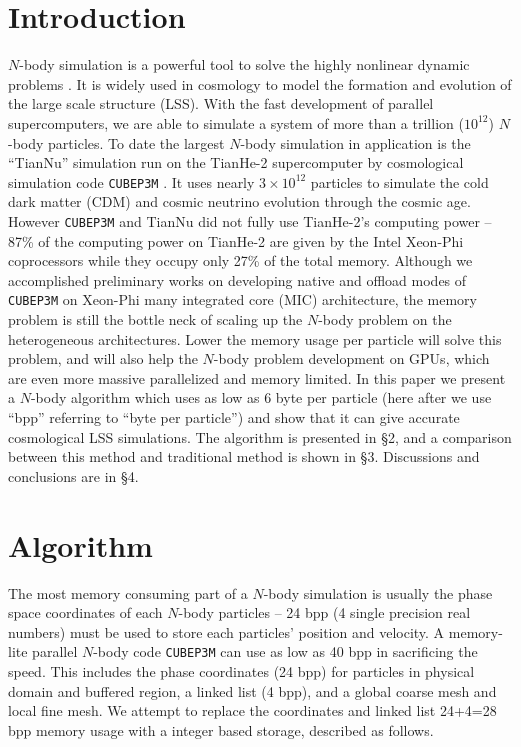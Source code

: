 \documentclass[10pt,twocolumn,preprint]{emulateapj}
\begin{document}
\section{Introduction}
$N$-body simulation is a powerful tool to solve the highly nonlinear dynamic problems \citep{1988csup.book.....H}. It is widely used in cosmology to model the formation and evolution of the large scale structure (LSS). With the fast development of parallel supercomputers, we are able to simulate a system of more than a trillion ($10^{12}$) $N$-body particles. To date the largest $N$-body simulation in application is the ``TianNu'' simulation run on the TianHe-2 supercomputer by cosmological simulation code {\tt CUBEP3M} \citep{2013MNRAS.436..540H}. It uses nearly $3\times 10^{12}$ particles to simulate the cold dark matter (CDM) and cosmic neutrino evolution through the cosmic age. However {\tt CUBEP3M} and TianNu did not fully use TianHe-2's computing power -- 87\% of the computing power on TianHe-2 are given by the Intel Xeon-Phi coprocessors while they occupy only 27\% of the total memory. Although we accomplished preliminary works on developing native and offload modes of {\tt CUBEP3M} on Xeon-Phi many integrated core (MIC) architecture, the memory problem is still the bottle neck of scaling up the $N$-body problem on the heterogeneous architectures. Lower the memory usage per particle will solve this problem, and will also help the $N$-body problem development on GPUs, which are even more massive parallelized and memory limited. In this paper we present a $N$-body algorithm which uses as low as 6 byte per particle (here after we use ``bpp'' referring to ``byte per particle'') and show that it can give accurate cosmological LSS simulations. The algorithm is presented in \S 2, and a comparison between this method and traditional method is shown in \S 3. Discussions and conclusions are in \S 4.

\section{Algorithm}
The most memory consuming part of a $N$-body simulation is usually the phase space coordinates of each $N$-body particles -- 24 bpp (4 single precision real numbers) must be used to store each particles' position and velocity. A memory-lite parallel $N$-body code {\tt CUBEP3M} can use as low as 40 bpp in sacrificing the speed. This includes the phase coordinates (24 bpp) for particles in physical domain and buffered region, a linked list (4 bpp), and a global coarse mesh and local fine mesh. We attempt to replace the coordinates and linked list 24+4=28 bpp memory usage with a integer based storage, described as follows.
\end{document}
